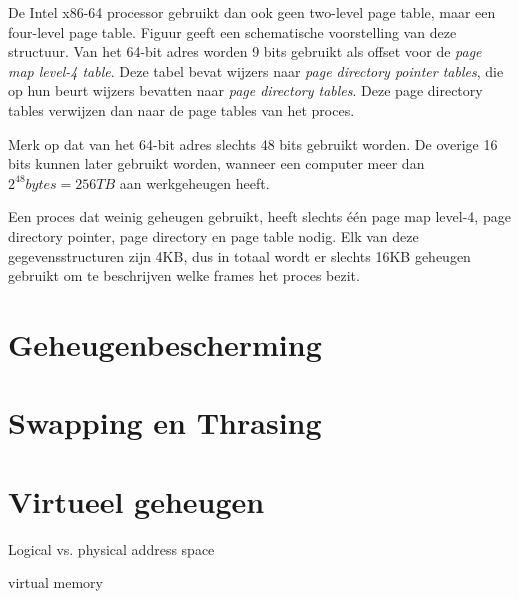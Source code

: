 De Intel x86-64 processor gebruikt dan ook geen two-level page table, maar een four-level page table. Figuur  geeft een schematische voorstelling van deze structuur. Van het 64-bit adres worden 9 bits gebruikt als offset voor de \emph{page map level-4 table}. Deze tabel bevat wijzers naar \emph{page directory pointer tables}, die op hun beurt wijzers bevatten naar \emph{page directory tables}. Deze page directory tables verwijzen dan naar de page tables van het proces.

Merk op dat van het 64-bit adres slechts 48 bits gebruikt worden. De overige 16 bits kunnen later gebruikt worden, wanneer een computer meer dan $2^{48} bytes = 256TB$ aan werkgeheugen heeft.

Een proces dat weinig geheugen gebruikt, heeft slechts \'e\'en page map level-4, page directory pointer, page directory en page table nodig. Elk van deze gegevensstructuren zijn 4KB, dus in totaal wordt er slechts 16KB geheugen gebruikt om te beschrijven welke frames het proces bezit.


\section{Geheugenbescherming}

\section{Swapping en Thrasing}


\section{Virtueel geheugen}

Logical vs. physical address space

virtual memory



